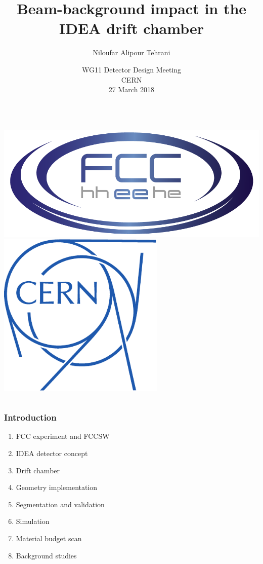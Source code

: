 \documentclass[hyperref={colorlinks=true,pdfpagelabels=false,linkcolor=black}, xcolor=dvipsnames,10pt]{beamer}
\title[]{Beam-background impact in the IDEA drift chamber}
\author[Niloufar Alipour Tehrani]{Niloufar Alipour Tehrani
  \vspace{0.3cm} }
\institute[CERN]{}
\date[27 March 2018]{WG11 Detector Design Meeting\\ \vspace{0.3cm}
  \scriptsize{CERN \\
27 March 2018}}
\renewcommand{\inserttotalframenumber}{\ref{lastframe}}
\begin{document}
\renewcommand{\inserttotalframenumber}{\pageref{lastslide}}



\begin{frame}[plain]
  
  \titlepage
  \begin{columns}
    \centering
    \includegraphics[width=\textwidth]{../logos/FCC-logo}
    \centering
    \includegraphics[width=0.6\textwidth]{../logos/logo_cern.pdf}
  \end{columns}
\end{frame}


\begin{frame}
	\frametitle{Introduction}
	
	\begin{enumerate}
	\item FCC experiment and FCCSW
	\item IDEA detector concept
	\item Drift chamber
	\item Geometry implementation
	\item Segmentation and validation
	\item Simulation
	\item Material budget scan
	\item Background studies
	\end{enumerate}
	



\end{frame}
\end{document}
